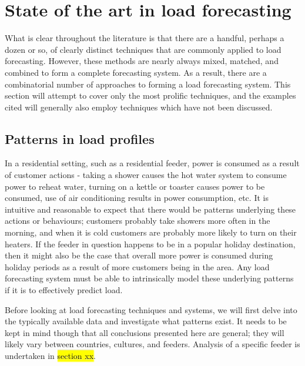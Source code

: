 \section{State of the art in load forecasting}
What is clear throughout the literature is that there are a handful, perhaps a dozen or so, of clearly distinct techniques that are commonly applied to load forecasting.
However, these methods are nearly always mixed, matched, and combined to form a complete forecasting system.
As a result, there are a combinatorial number of approaches to forming a load forecasting system.
This section will attempt to cover only the most prolific techniques, and the examples cited will generally also employ techniques which have not been discussed. 

\subsection{Patterns in load profiles}
\label{patterns-profiles}
In a residential setting, such as a residential feeder, power is consumed as a result of customer actions - taking a shower causes the hot water system to consume power to reheat water, turning on a kettle or toaster causes power to be consumed, use of air conditioning results in power consumption, etc.
It is intuitive and reasonable to expect that there would be patterns underlying these actions or behaviours; customers probably take showers more often in the morning, and when it is cold customers are probably more likely to turn on their heaters.
If the feeder in question happens to be in a popular holiday destination, then it might also be the case that overall more power is consumed during holiday periods as a result of more customers being in the area.
Any load forecasting system must be able to intrinsically model these underlying patterns if it is to effectively predict load.
\par
Before looking at load forecasting techniques and systems, we will first delve into the typically available data and investigate what patterns exist.
It needs to be kept in mind though that all conclusions presented here are general; they will likely vary between countries, cultures, and feeders.
Analysis of a specific feeder is undertaken in \hl{section xx}.

